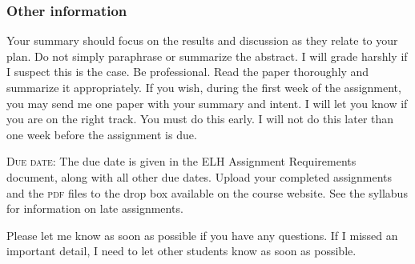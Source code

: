 \documentclass[12pt]{article}
\begin{document}
\subsubsection*{Other information}

Your summary should focus on the results and discussion as they relate to your plan. Do not simply paraphrase or summarize the abstract. I will grade harshly if I suspect this is the case. Be professional. Read the paper thoroughly and summarize it appropriately. If you wish, during the first week of the assignment, you may send me one paper with your summary and intent. I will let you know if you are on the right track. You must do this early. I will not do this later than one week before the assignment is due.

\textsc{Due date:} The due date is given in the ELH Assignment Requirements document, along with all other due dates. Upload your completed assignments and the \textsc{pdf} files to the drop box available on the course website. See the syllabus for information on late assignments.

\vspace*{\baselineskip}

Please let me know as soon as possible if you have any questions. If I missed an important detail, I need to let other students know as soon as possible.
\end{document}
